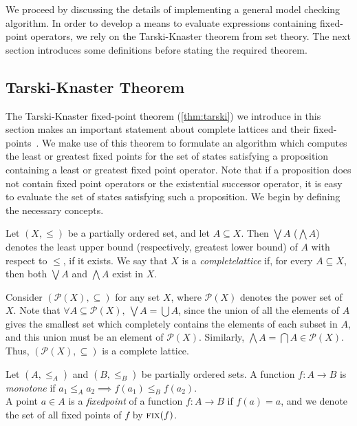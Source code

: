 We proceed by discussing the details of implementing a general model checking algorithm. In order to develop a means to evaluate expressions containing fixed-point operators, we rely on the Tarski-Knaster theorem from set theory. The next section introduces some definitions before stating the required theorem.




\subsection{Tarski-Knaster Theorem}

The Tarski-Knaster fixed-point theorem (\autoref{thm:tarski}) we introduce in this section makes an important statement about complete lattices and their fixed-points~\cite{Tarski1955}. We make use of this theorem to formulate an algorithm which computes the least or greatest fixed points for the set of states satisfying a \mucalc{} proposition containing a least or greatest fixed point operator. Note that if a proposition does not contain fixed point operators or the existential successor operator, it is easy to evaluate the set of states satisfying such a proposition. We begin by defining the necessary concepts.

\begin{defn}
    Let $(X, \leq)$ be a partially ordered set, and let $A \subseteq X$. Then $\bigvee A$ ($\bigwedge A$) denotes the least upper bound (respectively, greatest lower bound) of $A$ with respect to $\leq$, if it exists. We say that $X$ is a {\em complete\/lattice} if, for every $A \subseteq X$, then both $\bigvee A$ and $\bigwedge A$ exist in $X$.
\end{defn}

\begin{exmp}\label{ex_complat}
Consider $(\mathcal{P}(X), \subseteq)$ for any set $X$, where $\mathcal{P}(X)$ denotes the power set of $X$. Note that $\forall A \subseteq \mathcal{P}(X), \ \bigvee A = \bigcup A$, since the union of all the elements of $A$ gives the smallest set which completely contains the elements of each subset in $A$, and this union must be an element of $\mathcal{P}(X)$. Similarly, $\bigwedge A = \bigcap A \in \mathcal{P}(X)$. Thus, $(\mathcal{P}(X), \subseteq)$ is a complete lattice.
\end{exmp}

\begin{defn}
Let $(A, \leq_A)$ and $(B, \leq_B)$ be partially ordered sets. A function $f : A \to B$ is {\em monotone\/} if $a_1 \leq_A a_2 \implies f(a_1) \leq_B f(a_2)$.\\
A point $a \in A$ is a {\em fixed\/point} of a function $f: A \to B$ if $f(a) = a$, and we denote the set of all fixed points of $f$ by $\textsc{fix}(f)$.
\end{defn}

